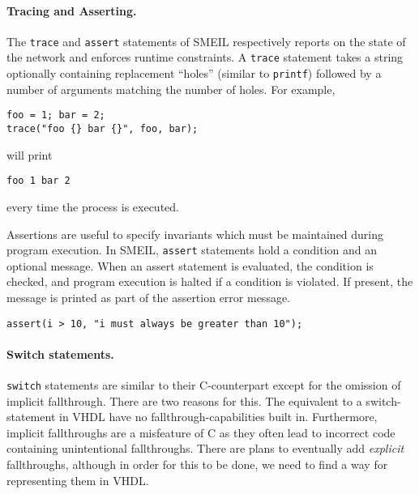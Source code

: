 \paragraph{Tracing and Asserting.}The {\tt trace} and {\tt assert} statements of
SMEIL respectively reports on the state of the network and enforces runtime
constraints. A {\tt trace} statement takes a string optionally containing
replacement ``holes'' (similar to {\tt printf}) followed by a number of
arguments matching the number of holes. For example,
\begin{lstlisting}[language=smeil]
foo = 1; bar = 2;
trace("foo {} bar {}", foo, bar);
\end{lstlisting}
will print
\begin{verbatim}
foo 1 bar 2
\end{verbatim}
every time the process is executed.

Assertions are useful to specify invariants which must be maintained during
program execution. In SMEIL, {\tt assert} statements hold a condition and an
optional message. When an assert statement is evaluated, the condition is
checked, and program execution is halted if a condition is violated. If present,
the message is printed as part of the assertion error message.
\begin{lstlisting}[language=smeil]
assert(i > 10, "i must always be greater than 10");
\end{lstlisting}


\paragraph{Switch statements.} \texttt{switch} statements are similar to their
C-counterpart except for the omission of implicit fallthrough. There are two
reasons for this. The equivalent to a switch-statement in VHDL have no
fallthrough-capabilities built in. Furthermore, implicit fallthroughs are a
misfeature of C as they often lead to incorrect code containing unintentional
fallthroughs. There are plans to eventually add {\itshape explicit}
fallthroughs, although in order for this to be done, we need to find a way for
representing them in VHDL.


